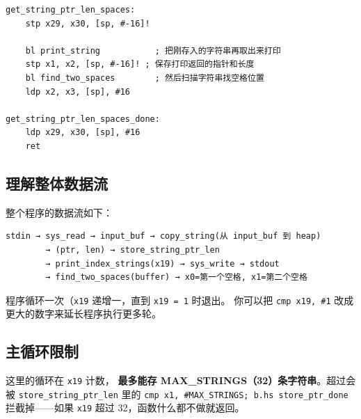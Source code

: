 \begin{lstlisting}[style=asm,caption=hello.s — 打印+解析]
get_string_ptr_len_spaces:
    stp x29, x30, [sp, #-16]!

    bl print_string           ; 把刚存入的字符串再取出来打印
    stp x1, x2, [sp, #-16]! ; 保存打印返回的指针和长度
    bl find_two_spaces        ; 然后扫描字符串找空格位置
    ldp x2, x3, [sp], #16

get_string_ptr_len_spaces_done:
    ldp x29, x30, [sp], #16
    ret
\end{lstlisting}

\subsection{理解整体数据流}

整个程序的数据流如下：

\begin{verbatim}
stdin → sys_read → input_buf → copy_string(从 input_buf 到 heap)
        → (ptr, len) → store_string_ptr_len
        → print_index_strings(x19) → sys_write → stdout
        → find_two_spaces(buffer) → x0=第一个空格, x1=第二个空格
\end{verbatim}

程序循环一次（\texttt{x19} 递增一，直到 \texttt{x19 = 1} 时退出。
你可以把 \texttt{cmp x19, \#1} 改成更大的数字来延长程序执行更多轮。

\subsection{主循环限制}

这里的循环在 \texttt{x19} 计数，
\textbf{最多能存 MAX\_STRINGS（32）条字符串}。超过会被
\texttt{store\_string\_ptr\_len} 里的 \texttt{cmp x1, \#MAX\_STRINGS; b.hs store\_ptr\_done} 拦截掉——如果 \texttt{x19} 超过 32，函数什么都不做就返回。
